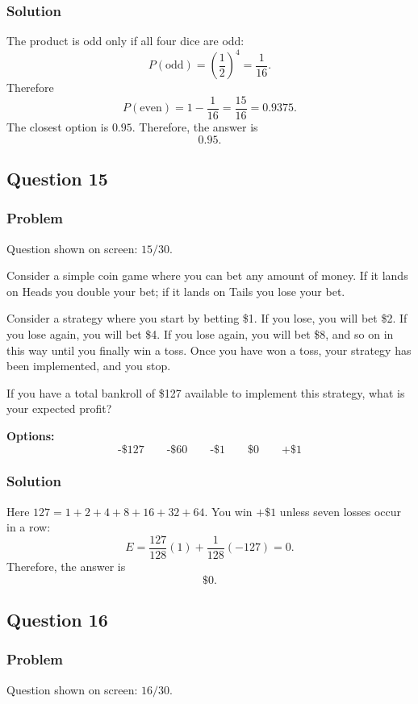 \documentclass[12pt]{article}
\begin{document}
\subsubsection{Solution}
The product is odd only if all four dice are odd:
\[
P(\text{odd})=\left(\frac12\right)^4=\frac{1}{16}.
\]
Therefore
\[
P(\text{even})=1-\frac{1}{16}=\frac{15}{16}=0.9375.
\]
The closest option is \(0.95\). Therefore, the answer is
\[
\boxed{0.95}.
\]

\subsection{Question 15}
\subsubsection{Problem}
Question shown on screen: \(15/30\).

Consider a simple coin game where you can bet any amount of money. If it lands on Heads you double your bet; if it lands on Tails you lose your bet.

Consider a strategy where you start by betting \$1. If you lose, you will bet \$2. If you lose again, you will bet \$4. If you lose again, you will bet \$8, and so on in this way until you finally win a toss. Once you have won a toss, your strategy has been implemented, and you stop.

If you have a total bankroll of \$127 available to implement this strategy, what is your expected profit?

\noindent\textbf{Options:}
\[
\boxed{\text{-\$127}}
\qquad
\boxed{\text{-\$60}}
\qquad
\boxed{\text{-\$1}}
\qquad
\boxed{\text{\$0}}
\qquad
\boxed{\text{+\$1}}
\]

\subsubsection{Solution}
Here \(127=1+2+4+8+16+32+64\). You win \(+\$1\) unless seven losses occur in a row:
\[
E=\frac{127}{128}(1)+\frac{1}{128}(-127)=0.
\]
Therefore, the answer is
\[
\boxed{\text{\$0}}.
\]

\subsection{Question 16}
\subsubsection{Problem}
Question shown on screen: \(16/30\).
\end{document}
